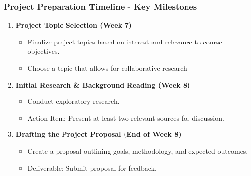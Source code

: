 \documentclass[aspectratio=169]{beamer}
\begin{document}
\begin{frame}[fragile]
    \frametitle{Project Preparation Timeline - Key Milestones}
    \begin{enumerate}
        \item \textbf{Project Topic Selection (Week 7)}
        \begin{itemize}
            \item Finalize project topics based on interest and relevance to course objectives.
            \item Choose a topic that allows for collaborative research.
        \end{itemize}
        
        \item \textbf{Initial Research \& Background Reading (Week 8)}
        \begin{itemize}
            \item Conduct exploratory research.
            \item Action Item: Present at least two relevant sources for discussion.
        \end{itemize}
        
        \item \textbf{Drafting the Project Proposal (End of Week 8)}
        \begin{itemize}
            \item Create a proposal outlining goals, methodology, and expected outcomes.
            \item Deliverable: Submit proposal for feedback.
        \end{itemize}
    \end{enumerate}
\end{frame}
\end{document}

